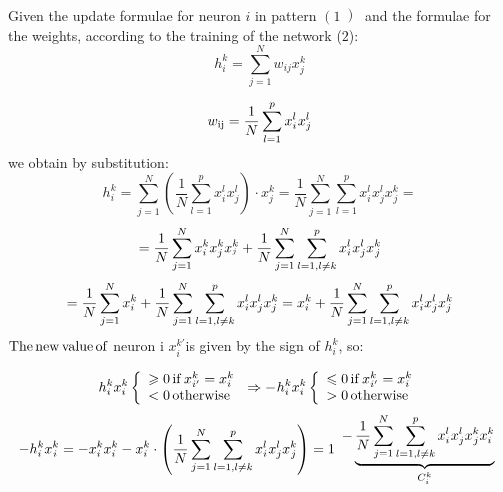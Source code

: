 Given the update formulae for neuron $i$ in pattern  $\left( 1
\left) \right. \right.$ and the formulae for the weights, according to the
training of the network ($2$):
\[ h_i^k = \sum^N_{j = 1} w_{i j} x_j^k  \]

\begin{equation}
  w_{\operatorname{ij}} = \frac{1}{N} \sum^p_{l = 1} x^l_{i^{}} x_j^l
\end{equation}
we obtain by substitution:
\[ h_i^k = \sum^N_{j = 1} \left(^{} \frac{1}{N} \sum^p_{l = 1} x^l_{i^{}}
   x^l_j \right)_{} \cdot x_j^k = \frac{1}{N}  \sum^N_{j = 1} \sum^p_{l = 1}
   x^l_{i^{}} x^l_j x^k_{^{} j} = \]
\[ = \frac{1}{N}  \sum^N_{j = 1} x^k_{i} x^k_j x^k_{^{j}} 
    + \frac{1}{N}  \sum^N_{j = 1} \sum^p_{l = 1 , l \neq k}
   x^l_{i^{}} x^l_j x^k_{^{} j} \]
\[ = \frac{1}{N}  \sum^N_{j = 1} x^k_{i} + \frac{1}{N}  \sum^N_{j = 1}
   \sum^p_{l = 1 , l \neq k} x^l_{i} x^l_{j} x^k_{j} = x^k_{i}
   + \frac{1}{N}  \sum^N_{j = 1} \sum^p_{l = 1 , l \neq k} x^l_{i}
   x^l_{j} x^k_{j} \]
\[  \]
$\operatorname{The} \operatorname{new} \operatorname{value} \operatorname{of}$ neuron i $x^{k'}_i $is given by
the sign of $h_i^k $, so:




\begin{equation}
  h^k_i x^k_i \left\{ \begin{array}{l}
    \geqslant 0    \operatorname{if} x^k_{i'} = x^k_i\\
    < 0 \operatorname{otherwise}
  \end{array} \right.^{}_{} \Rightarrow -_{} h^k_i x^k_i \left\{
  \begin{array}{l}
    \leqslant 0    \operatorname{if} x^k_{i'} = x^k_i\\
    > 0 \operatorname{otherwise}
  \end{array} \right.
\end{equation}
\begin{equation}
  - h^k_i x^k_{^{} i} = - x^k_{i^{}} x^k_{i^{}} - x^k_{i^{}} \cdot \left(
  \frac{1}{N}  \sum^N_{j = 1} \sum^p_{l = 1 , l \neq k} x^l_{i^{}}
  x^l_j x^k_{^{} j} \right) = 1 \begin{array}{c}
    - \underbrace{\frac{1}{N} \sum^N_{j = 1} \sum^p_{l = 1 , l \neq k}
    x^l_{i^{}} x^l_j x^k_{^{} j} x^k_i}_{C^k_i}
  \end{array}
\end{equation}
\ \ \ \ \ \ \ \ \ \ \ \ \ \ \ \ \ \ \ \ \ \ \ \ \ \ \ \ \ \ \ \ \ \ \ \ \ \ \
\ \ \ \ \ \ \ \ \ \ \ \ \ \ \ \ \ \ \ \ \ \ \ \ \ \ \ \ \ \ \ \ \ \ \ \ \ \ \
\ \ \ \ \ \ \ \ \ \ \ \ \ \ \ \ \ \

